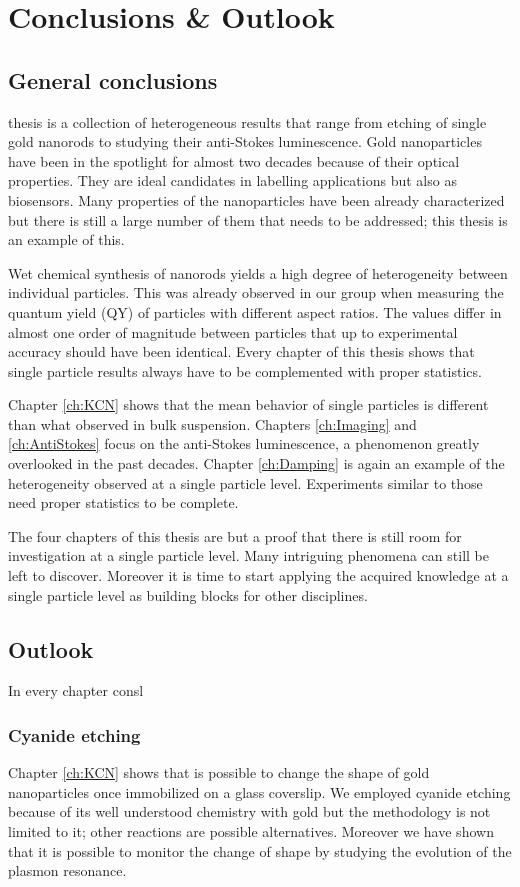 \chapter{Conclusions \& Outlook}
\label{conclusions}

\section{General conclusions}
 thesis is a collection of heterogeneous results that range from
etching of single gold nanorods to studying their anti-Stokes luminescence. Gold
nanoparticles have been in the spotlight for almost two decades because of their
optical properties. They are ideal candidates in labelling applications but also
as biosensors. Many properties of the nanoparticles have been already
characterized but there is still a large number of them that needs to be
addressed; this thesis is an example of this.

Wet chemical synthesis of nanorods yields a high degree of heterogeneity between
individual particles. This was already observed in our group when measuring the
quantum yield (QY) of particles with different aspect ratios. The values differ
in almost one order of magnitude between particles that up to experimental
accuracy should have been identical. Every chapter of this thesis shows that
single particle results always have to be complemented with proper statistics.

Chapter \ref{ch:KCN} shows that the mean behavior of single particles is
different than what observed in bulk suspension. Chapters \ref{ch:Imaging} and
\ref{ch:AntiStokes} focus on the anti-Stokes luminescence, a phenomenon greatly
overlooked in the past decades. Chapter \ref{ch:Damping} is again an example of
the heterogeneity observed at a single particle level. Experiments similar to
those need proper statistics to be complete. 

The four chapters of this thesis are but a proof that there is still room for
investigation at a single particle level. Many intriguing phenomena can still be
left to discover. Moreover it is time to start applying the acquired knowledge
at a single particle level as building blocks for other disciplines. 

\section{Outlook}
In every chapter consl

\subsection{Cyanide etching}
Chapter \ref{ch:KCN} shows that is possible to change the shape of gold
nanoparticles once immobilized on a glass coverslip. We employed cyanide etching
because of its well understood chemistry with gold but the methodology is not
limited to it; other reactions are possible alternatives. Moreover we have shown
that it is possible to monitor the change of shape by studying the evolution of
the plasmon resonance.

